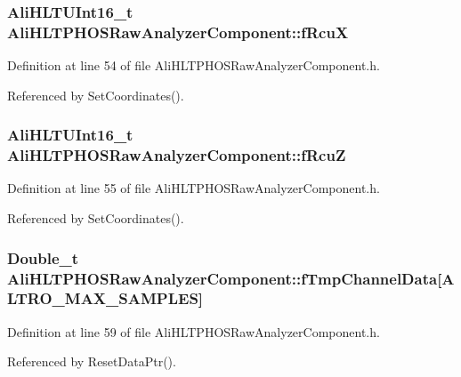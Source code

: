 \subsubsection{\setlength{\rightskip}{0pt plus 5cm}Ali\-HLTUInt16\_\-t {\bf Ali\-HLTPHOSRaw\-Analyzer\-Component::f\-Rcu\-X}\hspace{0.3cm}{\tt  [private]}}\label{classAliHLTPHOSRawAnalyzerComponent_AliHLTPHOSRawAnalyzerComponentr1}




Definition at line 54 of file Ali\-HLTPHOSRaw\-Analyzer\-Component.h.

Referenced by Set\-Coordinates().
\subsubsection{\setlength{\rightskip}{0pt plus 5cm}Ali\-HLTUInt16\_\-t {\bf Ali\-HLTPHOSRaw\-Analyzer\-Component::f\-Rcu\-Z}\hspace{0.3cm}{\tt  [private]}}\label{classAliHLTPHOSRawAnalyzerComponent_AliHLTPHOSRawAnalyzerComponentr2}




Definition at line 55 of file Ali\-HLTPHOSRaw\-Analyzer\-Component.h.

Referenced by Set\-Coordinates().
\subsubsection{\setlength{\rightskip}{0pt plus 5cm}Double\_\-t {\bf Ali\-HLTPHOSRaw\-Analyzer\-Component::f\-Tmp\-Channel\-Data}[ALTRO\_\-MAX\_\-SAMPLES]\hspace{0.3cm}{\tt  [private]}}\label{classAliHLTPHOSRawAnalyzerComponent_AliHLTPHOSRawAnalyzerComponentr6}




Definition at line 59 of file Ali\-HLTPHOSRaw\-Analyzer\-Component.h.

Referenced by Reset\-Data\-Ptr().
